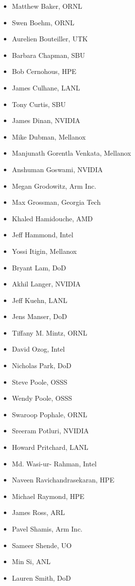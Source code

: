 \begin{itemize}
\item Matthew Baker, \ac{ORNL}
\item Swen Boehm, \ac{ORNL}
\item Aurelien Bouteiller, \ac{UTK}
\item Barbara Chapman, \ac{SBU}
\item Bob Cernohous, \ac{HPE}
\item James Culhane, \ac{LANL}
\item Tony Curtis, \ac{SBU}
\item James Dinan, NVIDIA
\item Mike Dubman, Mellanox
\item Manjunath Gorentla Venkata, Mellanox
\item Anshuman Goswami, NVIDIA
\item Megan Grodowitz, Arm Inc.
\item Max Grossman, Georgia Tech
\item Khaled Hamidouche, \ac{AMD}
\item Jeff Hammond, Intel
\item Yossi Itigin, Mellanox
\item Bryant Lam, \ac{DoD}
\item Akhil Langer, NVIDIA
\item Jeff Kuehn, \ac{LANL}
\item Jens Manser, \ac{DoD}
\item Tiffany M. Mintz, \ac{ORNL}
\item David Ozog, Intel
\item Nicholas Park, \ac{DoD}
\item Steve Poole, \ac{OSSS}
\item Wendy Poole, \ac{OSSS}
\item Swaroop Pophale, \ac{ORNL}
\item Sreeram Potluri, NVIDIA
\item Howard Pritchard, \ac{LANL}
\item Md. Wasi-ur- Rahman, Intel
\item Naveen Ravichandrasekaran, \ac{HPE}
\item Michael Raymond, \ac{HPE}
\item James Ross, \ac{ARL}
\item Pavel Shamis, Arm Inc.
\item Sameer Shende, \ac{UO}
\item Min Si, \ac{ANL}
\item Lauren Smith, \ac{DoD}

\end{itemize}

